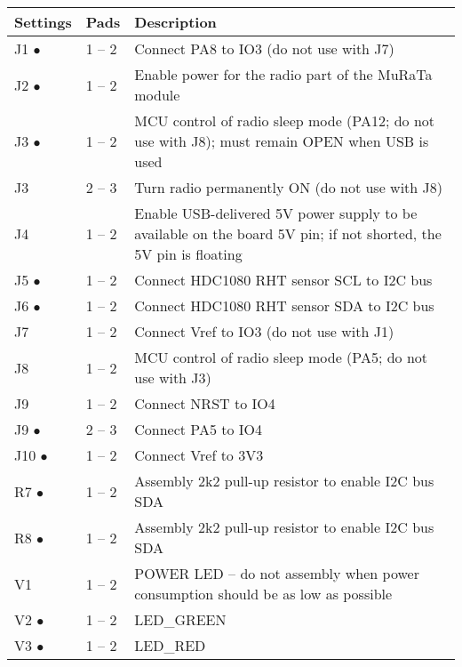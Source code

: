    \begin{table*}[!ht]
    \hspace*{-4cm}
    \begin{tabular}{| p{2cm} | p{1cm} | p{9cm} |}
        \hline
        \rowcolor{SeaGreen3!30!} {\bf Settings\footnotemark{}} & {\bf Pads} & {\bf Description} \\
        \hline
        \hline
        J1  \hfill $\bullet$ & 1 -- 2 & Connect PA8 to IO3 (do not use with J7)\\
        \hline
        J2  \hfill $\bullet$ & 1 -- 2 & Enable power for the radio part of the MuRaTa module\\
        \hline
        J3  \hfill $\bullet$ & 1 -- 2 & MCU control of radio sleep mode (PA12; do not use with J8); must remain OPEN when USB is used\\
        \hline
        J3                  & 2 -- 3 & Turn radio permanently ON (do not use with J8) \\
        \hline
        J4                  & 1 -- 2 & Enable USB-delivered 5V power supply to be available on the board 5V pin; if not shorted, the 5V pin is floating\\
        \hline
        J5  \hfill $\bullet$ & 1 -- 2& Connect HDC1080 RHT sensor SCL to I2C bus\\
        \hline
        J6  \hfill $\bullet$ & 1 -- 2& Connect HDC1080 RHT sensor SDA to I2C bus\\
        \hline
        J7                   & 1 -- 2 & Connect Vref to IO3 (do not use with J1)\\
        \hline
        J8                   & 1 -- 2 & MCU control of radio sleep mode (PA5; do not use with J3)\\
        \hline
        J9                   & 1 -- 2 & Connect NRST to IO4\\
        \hline
        J9  \hfill $\bullet$ & 2 -- 3 & Connect PA5 to IO4\\
        \hline
        J10 \hfill $\bullet$ & 1 -- 2 & Connect Vref to 3V3\\
        \hline
        R7  \hfill $\bullet$ & 1 -- 2& Assembly 2k2 pull-up resistor to enable I2C bus SDA\\
        \hline
        R8  \hfill $\bullet$ & 1 -- 2& Assembly 2k2 pull-up resistor to enable I2C bus SDA\\
        \hline
        V1                   & 1 -- 2& POWER LED -- do not assembly when power consumption should be as low as possible\\
        \hline
        V2  \hfill $\bullet$ & 1 -- 2&  LED\_GREEN \\
        \hline
        V3  \hfill $\bullet$ & 1 -- 2&  LED\_RED \\
        \hline
    \end{tabular}
    \label{tab:boards:MBP}
   \end{table*}
   
